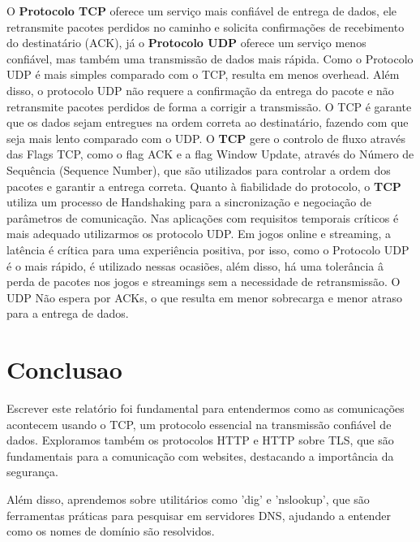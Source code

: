 \documentclass{article}
\begin{document}
O \textbf{Protocolo TCP} oferece um serviço mais confiável de entrega de dados, ele retransmite pacotes perdidos no caminho e solicita confirmações de recebimento do destinatário (ACK), já o \textbf{Protocolo UDP} oferece um serviço menos confiável, mas também uma transmissão de dados mais rápida. Como o Protocolo UDP é mais simples comparado com o TCP, resulta em menos overhead. Além disso, o protocolo UDP não requere a confirmação da entrega do pacote e não retransmite pacotes perdidos de forma a corrigir a transmissão. O TCP é garante que os dados sejam entregues na ordem correta ao destinatário, fazendo com que seja mais lento comparado com o UDP. O \textbf{TCP} gere o controlo de fluxo através das Flags TCP, como o flag ACK e a flag Window Update, através do Número de Sequência (Sequence Number), que são utilizados para controlar a ordem dos pacotes e garantir a entrega correta. Quanto à fiabilidade do protocolo, o \textbf{TCP} utiliza um processo de Handshaking para a sincronização e negociação de parâmetros de comunicação.
Nas aplicações com requisitos temporais críticos é mais adequado utilizarmos os protocolo UDP. Em jogos online e streaming, a latência é crítica para uma experiência positiva, por isso, como o Protocolo UDP é o mais rápido, é utilizado nessas ocasiões, além disso, há uma tolerância â perda de pacotes nos jogos e streamings sem a necessidade de retransmissão. O UDP Não espera por ACKs, o que resulta em menor sobrecarga e menor atraso para a entrega de dados.

\section{Conclusao}

Escrever este relatório foi fundamental para entendermos como as comunicações acontecem usando o TCP, um protocolo essencial na transmissão confiável de dados. Exploramos também os protocolos HTTP e HTTP sobre TLS, que são fundamentais para a comunicação com websites, destacando a importância da segurança.

Além disso, aprendemos sobre utilitários como 'dig' e 'nslookup', que são ferramentas práticas para pesquisar em servidores DNS, ajudando a entender como os nomes de domínio são resolvidos.
\end{document}
